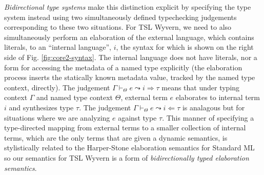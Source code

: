 \emph{Bidirectional type systems} \cite{Pierce:2000:LTI:345099.345100} make this distinction explicit by specifying the type system instead using two simultaneously defined typechecking judgements corresponding to these two situations. %
For TSL Wyvern, we need to also simultaneously perform an elaboration of the external language, which contains literals, to an ``internal language'', $i$, the syntax for which is shown on the right side of Fig. \ref{fig:core2-syntax}. The internal language does not have literals, nor a form for accessing the metadata of a named type explicitly (the elaboration process inserts the statically known metadata value, tracked by the named type context, directly). The judgement $\Gamma \vdash_\Theta e \leadsto i \Rightarrow \tau$ means that under typing context $\Gamma$ and named type context $\Theta$, external term $e$ elaborates to internal term $i$ and synthesizes type $\tau$. The judgement $\Gamma \vdash_\Theta e \leadsto i \Leftarrow \tau$ is analagous but for situations where we are analyzing $e$ against type $\tau$. This manner of specifying a type-directed mapping from external terms to a smaller collection of internal terms, which are the only terms that are given a dynamic semantics, is stylistically related to the Harper-Stone elaboration semantics for Standard ML \cite{Harper00atype-theoretic} so  our semantics for TSL Wyvern is a form of \emph{bidirectionally typed elaboration semantics}.%

